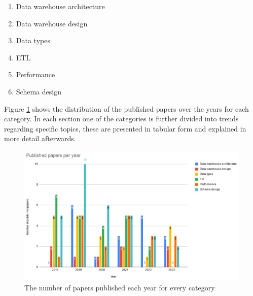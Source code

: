 \documentclass[11pt]{article}
\begin{document}
\begin{enumerate}
    \item Data warehouse architecture
    \item Data warehouse design
    \item Data types
    \item ETL
    \item Performance
    \item Schema design
\end{enumerate}

Figure \ref{fig:papers} shows the distribution of the published papers over the years for each category. In each section one of the categories is further divided into trends regarding specific topics, these are presented in tabular form and explained in more detail afterwards.

\begin{figure}
\centering
\includegraphics[scale=0.75]{Images/Papers per year2.0.png}
\caption{The number of papers published each year for every category}
\label{fig:papers}
\end{figure}
\end{document}
